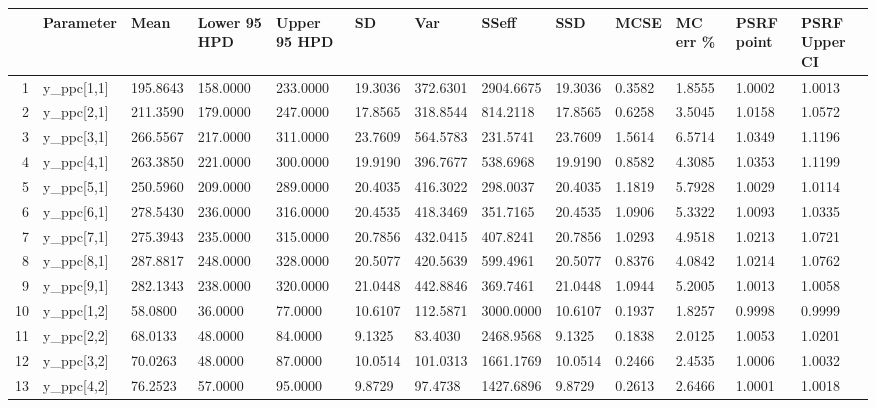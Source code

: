 \begin{table}[ht]
\centering
\begin{tabular}{rllllllllllll}
  \hline
 & Parameter & Mean & Lower 95 HPD & Upper 95 HPD & SD & Var & SSeff & SSD & MCSE & MC err \% & PSRF point & PSRF Upper CI \\ 
  \hline
1 & y\_ppc[1,1] & 195.8643 & 158.0000 & 233.0000 & 19.3036 & 372.6301 & 2904.6675 & 19.3036 & 0.3582 & 1.8555 & 1.0002 & 1.0013 \\ 
  2 & y\_ppc[2,1] & 211.3590 & 179.0000 & 247.0000 & 17.8565 & 318.8544 &  814.2118 & 17.8565 & 0.6258 & 3.5045 & 1.0158 & 1.0572 \\ 
  3 & y\_ppc[3,1] & 266.5567 & 217.0000 & 311.0000 & 23.7609 & 564.5783 &  231.5741 & 23.7609 & 1.5614 & 6.5714 & 1.0349 & 1.1196 \\ 
  4 & y\_ppc[4,1] & 263.3850 & 221.0000 & 300.0000 & 19.9190 & 396.7677 &  538.6968 & 19.9190 & 0.8582 & 4.3085 & 1.0353 & 1.1199 \\ 
  5 & y\_ppc[5,1] & 250.5960 & 209.0000 & 289.0000 & 20.4035 & 416.3022 &  298.0037 & 20.4035 & 1.1819 & 5.7928 & 1.0029 & 1.0114 \\ 
  6 & y\_ppc[6,1] & 278.5430 & 236.0000 & 316.0000 & 20.4535 & 418.3469 &  351.7165 & 20.4535 & 1.0906 & 5.3322 & 1.0093 & 1.0335 \\ 
  7 & y\_ppc[7,1] & 275.3943 & 235.0000 & 315.0000 & 20.7856 & 432.0415 &  407.8241 & 20.7856 & 1.0293 & 4.9518 & 1.0213 & 1.0721 \\ 
  8 & y\_ppc[8,1] & 287.8817 & 248.0000 & 328.0000 & 20.5077 & 420.5639 &  599.4961 & 20.5077 & 0.8376 & 4.0842 & 1.0214 & 1.0762 \\ 
  9 & y\_ppc[9,1] & 282.1343 & 238.0000 & 320.0000 & 21.0448 & 442.8846 &  369.7461 & 21.0448 & 1.0944 & 5.2005 & 1.0013 & 1.0058 \\ 
  10 & y\_ppc[1,2] &  58.0800 &  36.0000 &  77.0000 & 10.6107 & 112.5871 & 3000.0000 & 10.6107 & 0.1937 & 1.8257 & 0.9998 & 0.9999 \\ 
  11 & y\_ppc[2,2] &  68.0133 &  48.0000 &  84.0000 &  9.1325 &  83.4030 & 2468.9568 &  9.1325 & 0.1838 & 2.0125 & 1.0053 & 1.0201 \\ 
  12 & y\_ppc[3,2] &  70.0263 &  48.0000 &  87.0000 & 10.0514 & 101.0313 & 1661.1769 & 10.0514 & 0.2466 & 2.4535 & 1.0006 & 1.0032 \\ 
  13 & y\_ppc[4,2] &  76.2523 &  57.0000 &  95.0000 &  9.8729 &  97.4738 & 1427.6896 &  9.8729 & 0.2613 & 2.6466 & 1.0001 & 1.0018 \\ 

\end{tabular}
\end{table}
